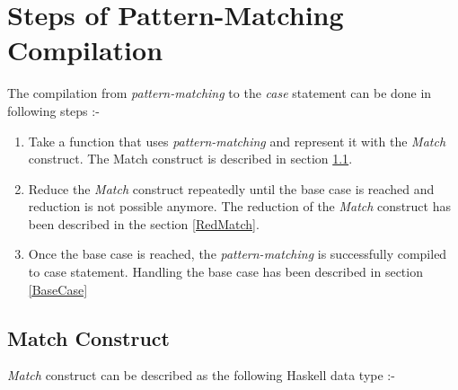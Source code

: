 \documentclass[11pt]{article}
\begin{document}
\section {Steps of Pattern-Matching Compilation}
The compilation from {\em pattern-matching} to the {\em case} statement  can be done in following steps :-
\begin {enumerate}
   \item Take a function that uses {\em pattern-matching} and represent it with  the {\em Match} construct. The Match construct is described in section \ref {MatchCon}.
   \item Reduce the {\em Match} construct repeatedly until the base case is reached and reduction is not possible anymore. The reduction of the {\em Match} construct has been described in the section \ref {RedMatch}. 
   \item Once the base case is reached, the {\em pattern-matching} is successfully compiled to case statement. Handling the base case has been described in 
   section \ref {BaseCase}
\end {enumerate}

\subsection {Match Construct} \label{MatchCon} 
{\em Match} construct can be described as the following Haskell data type :- 
\end{document}

